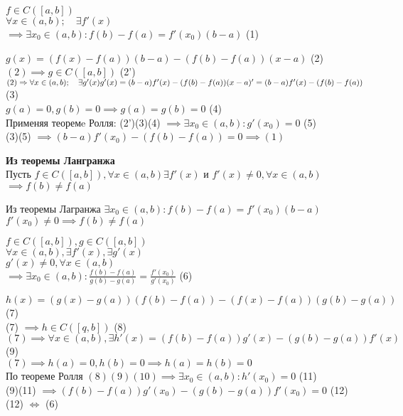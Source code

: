     \begin{theorem}
        $f \in C([a,b])$ \\
        $\forall x \in (a,b); \quad  \exists f'(x)$ \\
        $\implies \exists x_0 \in (a, b): f(b) -f(a)=f'(x_0)(b-a)$ (1)
    \end{theorem}
    \begin{replacementproof}
        $g(x) = (f(x)-f(a))(b-a)-(f(b)-f(a))(x-a)$ (2)\\
        $(2) \implies g \in C([a,b])$ (2') \\
        $(2) \implies \forall x \in (a,b); \quad  \exists g'(x) \\
        g'(x) =(b-a)f'(x) -(f(b)-f(a))(x-a)'=(b-a)f'(x)-(f(b)-f(a))$ (3)\\
        $g(a) = 0, g(b)=0 \implies g(a)=g(b)=0$ (4)\\
        Применяя теоремe Ролля: (2')(3)(4) $\implies \exists x_0 \in (a,b): g'(x_0)=0$ (5)\\
        (3)(5) $\implies (b-a)f'(x_0)-(f(b)-f(a))=0 \implies (1)$
    \end{replacementproof}
    \begin{properties}
        \textbf{Из теоремы Лангранжа}\\
        Пусть $f \in C([a,b]), \forall x \in (a,b) \exists f'(x)$ и $f'(x) \neq 0, \forall x \in (a,b)$
        $\implies f(b) \neq f(a)$
    \end{properties}
    \begin{replacementproof}
        Из теоремы Лагранжа $\exists x_0 \in (a,b): f(b) - f(a) = f'(x_0)(b-a)$ \\
        $f'(x_0) \neq 0 \implies f(b) \neq f(a)$
    \end{replacementproof}
    
    

    \begin{theorem}
        $f \in C([a,b]), g \in C([a,b])$ \\
        $\forall x \in (a,b), \exists f'(x), \exists g'(x)$ \\
        $g'(x) \neq 0, \forall x \in (a,b)$ \\
        $\implies \exists x_0 \in (a,b): \displaystyle\frac{f(b)-f(a)}{g(b)-g(a)}=\displaystyle\frac{f'(x_0)}{g'(x_0)}$ (6)
    \end{theorem}
    \begin{replacementproof}
        $h(x) = (g(x) - g(a))(f(b)-f(a)) - (f(x)-f(a))(g(b)-g(a))$ (7)\\
        (7) $\implies h \in C([q,b])$ (8)\\
        $(7) \implies \forall x \in (a,b), \exists h'(x)=(f(b)-f(a))g'(x)-(g(b) - g(a))f'(x)$ (9)\\
        $(7) \implies h(a) = 0, h(b)=0 \implies h(a)=h(b)=0$ \\
        По теореме Ролля $(8)(9)(10) \implies \exists x_0 \in (a,b): h'(x_0)=0$ (11)\\
        (9)(11) $\implies (f(b) - f(a))g'(x_0) - (g(b) - g(a))f'(x_0)=0$ (12)\\
        (12) $\iff$ (6)
    \end{replacementproof}
    
